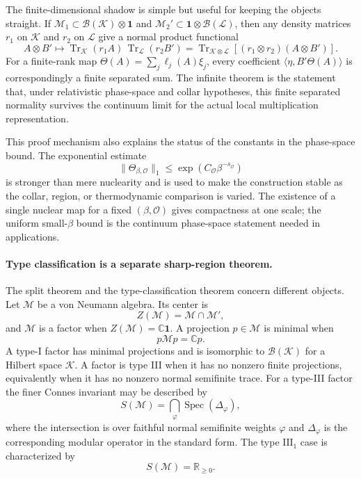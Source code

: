 The finite-dimensional shadow is simple but useful for keeping the objects
straight.  If
\(\mathcal M_1\subset\mathcal B(\mathcal K)\otimes\mathbf 1\) and
\(\mathcal M_2'\subset\mathbf 1\otimes\mathcal B(\mathcal L)\), then any
density matrices \(r_1\) on \(\mathcal K\) and \(r_2\) on \(\mathcal L\) give
a normal product functional
\[
  A\otimes B'\longmapsto
  \operatorname{Tr}_{\mathcal K}(r_1A)\,
  \operatorname{Tr}_{\mathcal L}(r_2B')
  =
  \operatorname{Tr}_{\mathcal K\otimes\mathcal L}
  \!\left[(r_1\otimes r_2)(A\otimes B')\right].
\]
For a finite-rank map
\(\Theta(A)=\sum_j\ell_j(A)\xi_j\), every coefficient
\(\langle\eta,B'\Theta(A)\rangle\) is correspondingly a finite separated sum.
The infinite theorem is the statement that, under relativistic phase-space
and collar hypotheses, this finite separated normality survives the continuum
limit for the actual local multiplication representation.

This proof mechanism also explains the status of the constants in the
phase-space bound.  The exponential estimate
\[
  \|\Theta_{\beta,\mathcal O}\|_1
  \le
  \exp(C_{\mathcal O}\beta^{-s_{\mathcal O}})
\]
is stronger than mere nuclearity and is used to make the construction stable
as the collar, region, or thermodynamic comparison is varied.  The existence
of a single nuclear map for a fixed \((\beta,\mathcal O)\) gives compactness
at one scale; the uniform small-\(\beta\) bound is the continuum
phase-space statement needed in applications.

\paragraph{Type classification is a separate sharp-region theorem.}
The split theorem and the type-classification theorem concern different
objects.  Let \(\mathcal M\) be a von Neumann algebra.  Its center is
\[
  Z(\mathcal M)=\mathcal M\cap\mathcal M',
\]
and \(\mathcal M\) is a factor when \(Z(\mathcal M)=\mathbb C\mathbf 1\).  A
projection \(p\in\mathcal M\) is minimal when
\[
  p\mathcal M p=\mathbb C p .
\]
A type-I factor has minimal projections and is isomorphic to
\(\mathcal B(\mathcal K)\) for a Hilbert space \(\mathcal K\).  A factor is
type III when it has no nonzero finite projections, equivalently when it has no
nonzero normal semifinite trace.  For a type-III factor the finer Connes
invariant may be described by
\[
  S(\mathcal M)
  =
  \bigcap_{\varphi}
  \operatorname{Spec}(\Delta_\varphi),
\]
where the intersection is over faithful normal semifinite weights
\(\varphi\) and \(\Delta_\varphi\) is the corresponding modular operator in
the standard form.  The type \(\mathrm{III}_1\) case is characterized by
\[
  S(\mathcal M)=\mathbb R_{\ge0}.
\]

